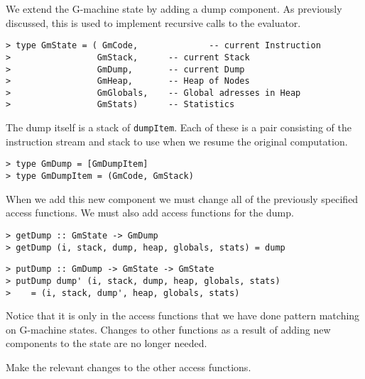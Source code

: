 We extend the G-machine state by adding a dump component. As previously
discussed, this is used to implement recursive calls to the evaluator.
\begin{verbatim}
> type GmState = ( GmCode,              -- current Instruction
>                 GmStack,      -- current Stack
>                 GmDump,       -- current Dump
>                 GmHeap,       -- Heap of Nodes
>                 GmGlobals,    -- Global adresses in Heap
>                 GmStats)      -- Statistics
\end{verbatim}
%
The dump itself is a stack of \mbox{\tt dumpItem}. Each of these is a pair
consisting of the instruction stream and stack to use when we resume
the original computation.
\begin{verbatim}
> type GmDump = [GmDumpItem]
> type GmDumpItem = (GmCode, GmStack)
\end{verbatim}
%
%
When we add this new component we must change all of the previously
specified access functions. We must also add access functions for the
dump.
\begin{verbatim}
> getDump :: GmState -> GmDump
> getDump (i, stack, dump, heap, globals, stats) = dump
\end{verbatim}
%
%
\begin{verbatim}
> putDump :: GmDump -> GmState -> GmState
> putDump dump' (i, stack, dump, heap, globals, stats)
>    = (i, stack, dump', heap, globals, stats)
\end{verbatim}
%
%
\par
Notice that it is only in the access functions that we have done
pattern matching on G-machine states. Changes to other functions as a
result of adding new components to the state are no longer needed.

\begin{exercise}\label{gm:X:access4}
Make the relevant changes to the other access functions.
\end{exercise}

